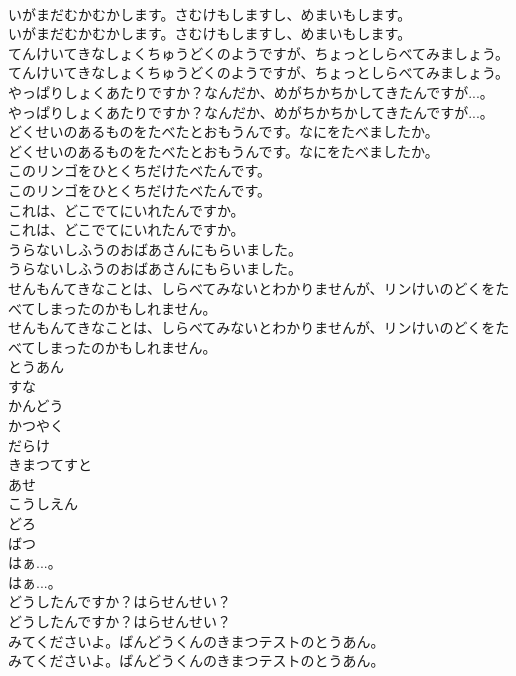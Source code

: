 \documentclass[8pt]{extreport}
\begin{document}
\begin{CJK}{UTF8}{min}
\\	いがまだむかむかします。さむけもしますし、めまいもします。
\\	いがまだむかむかします。さむけもしますし、めまいもします。
\\	てんけいてきなしょくちゅうどくのようですが、ちょっとしらべてみましょう。
\\	てんけいてきなしょくちゅうどくのようですが、ちょっとしらべてみましょう。
\\	やっぱりしょくあたりですか？なんだか、めがちかちかしてきたんですが...。
\\	やっぱりしょくあたりですか？なんだか、めがちかちかしてきたんですが...。
\\	どくせいのあるものをたべたとおもうんです。なにをたべましたか。
\\	どくせいのあるものをたべたとおもうんです。なにをたべましたか。
\\	このリンゴをひとくちだけたべたんです。
\\	このリンゴをひとくちだけたべたんです。
\\	これは、どこでてにいれたんですか。
\\	これは、どこでてにいれたんですか。
\\	うらないしふうのおばあさんにもらいました。
\\	うらないしふうのおばあさんにもらいました。
\\	せんもんてきなことは、しらべてみないとわかりませんが、リンけいのどくをたべてしまったのかもしれません。
\\	せんもんてきなことは、しらべてみないとわかりませんが、リンけいのどくをたべてしまったのかもしれません。
\\	とうあん
\\	すな
\\	かんどう
\\	かつやく
\\	だらけ
\\	きまつてすと
\\	あせ
\\	こうしえん
\\	どろ
\\	ばつ
\\	はぁ...。
\\	はぁ...。
\\	どうしたんですか？はらせんせい？
\\	どうしたんですか？はらせんせい？
\\	みてくださいよ。ばんどうくんのきまつテストのとうあん。
\\	みてくださいよ。ばんどうくんのきまつテストのとうあん。

\end{CJK}
\end{document}
